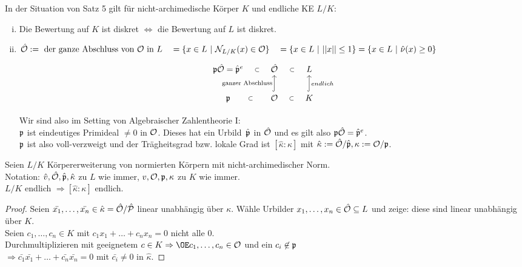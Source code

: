 \begin{Kor}
In der Situation von Satz 5 gilt für nicht-archimedische Körper $K$ und endliche KE $L/K$:
\begin{enumerate}[(i)]
\item Die Bewertung auf $K$ ist diskret $\iff$ die Bewertung auf $L$ ist diskret.
\item $\hO:= \text{ der ganze Abschluss von }\O \text{ in }L \\
\hphantom{\hO \,}= \{x \in L \ | \ \NLK(x) \in \O\}\\
\hphantom{\hO \,}= \{x \in L \ | \ ||x|| \leq 1 \} = \{x \in L \ | \ \hat{\nu}(x) \geq 0\}$\\
\[\begin{tikzcd}
\p\hO=\hat{\p}^e \arrow[draw=none]{r}[sloped,auto=false]{\subset} & \hO \arrow[draw=none]{r}[sloped,auto=false]{\subset} &L\\ %
\p \arrow[draw=none]{r}[sloped,auto=false]{\subset}  & \O \arrow[draw=none]{r}[sloped,auto=false]{\subset} \arrow[hook]{u}{\text{ganzer Abschluss}} &K \arrow[hook, swap]{u}{endlich}
\end{tikzcd}\]

Wir sind also im Setting von Algebraischer Zahlentheorie I:\\
$\mathfrak{p}$ ist eindeutiges Primideal $\neq 0$ in $\mathcal{O}$. Dieses hat ein \glqq Urbild\grqq \ $\hat{\mathfrak{p}}$ in $\hat{\mathcal{O}}$ und es gilt also $\mathfrak{p}\hat{\mathcal{O}}=\hat{\mathfrak{p}}^e$.\\
$\mathfrak{p}$ ist also voll-verzweigt und der Trägheitsgrad bzw. lokale Grad ist $[\hat \kappa:\kappa]$ mit $\hat \kappa:=\hat{\mathcal{O}}/\hat{\mathfrak{p}}, \kappa:=\mathcal{O}/\mathfrak{p}$.
\end{enumerate}
\end{Kor}

\begin{Bem}
Seien $L/K$ Körpererweiterung von normierten Körpern mit nicht-archimedischer Norm.\\
Notation: $\hat{v}, \hat{\mathcal{O}}, \hat{\mathfrak{p}}, \hat{\kappa}$ zu $L$ wie immer, $v, \mathcal{O}, \mathfrak{p}, \kappa$ zu $K$ wie immer.\\
$L/K$ endlich $\Rightarrow [\hat{\kappa}: \kappa]$ endlich.
\end{Bem}

\begin{proof}
Seien $\bar{x_1}, \dots, \bar{x_n} \in \hat{\kappa}= \hat{\mathcal{O}}/\hat{\mathcal{P}}$ linear unabhängig über $\kappa$.
Wähle Urbilder $x_1, \dots, x_n \in \hat{\mathcal{O}} \subseteq L$ und zeige: diese sind linear unabhängig über $K$.\\
Seien $c_1, \dots, c_n \in K$ mit $c_1 x_1 + \dots + c_nx_n=0$ nicht alle $0$.\\
Durchmultiplizieren mit geeignetem $c\in K \Rightarrow \OE c_1, \dots, c_n \in \O$ und ein $c_i \not \in \mathfrak{p}$\\
$\Rightarrow \bar{c_1}\bar{x_1}+\dots+\bar{c_n}\bar{x_n}=0$ mit $\bar{c_i} \neq 0$ in $\hat{\kappa}$.
\end{proof}


